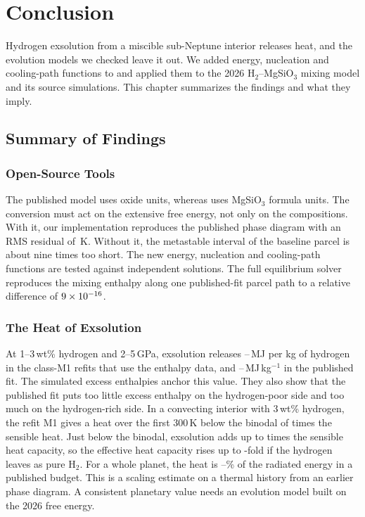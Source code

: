 \chapter{Conclusion}\label{ch:conclusion}

Hydrogen exsolution from a miscible sub-Neptune interior releases heat, and the evolution models
we checked leave it out. We added energy, nucleation and cooling-path functions to \Atm{} and
applied them to the 2026 H$_2$--MgSiO$_3$ mixing model and its source simulations. This chapter
summarizes the findings and what they imply.

\section{Summary of Findings}

\subsection{Open-Source Tools}

The published model uses oxide units, whereas \Atm{} uses MgSiO$_3$ formula units. The
conversion must act on the extensive free energy, not only on the compositions. With it, our
implementation reproduces the published phase diagram with an RMS residual of \digRms{}\,K.
Without it, the metastable interval of the baseline parcel is about nine times too short. The
new energy, nucleation and cooling-path functions are tested against independent solutions. The
full \Atm{} equilibrium solver reproduces the mixing enthalpy along one published-fit parcel path
to a relative difference of $9\times10^{-16}{}$.

\subsection{The Heat of Exsolution}

At 1--3\,wt\% hydrogen and 2--5\,GPa, exsolution releases \hbarMOneLo{}--\hbarMOneHi{}\,MJ per
kg of hydrogen in the class-M1 refits that use the enthalpy data, and
\hbarPubLo{}--\hbarPubHi{}\,MJ\,kg$^{-1}$ in the published fit. The simulated excess enthalpies
anchor this value. They also show that the published fit puts too little excess enthalpy on the
hydrogen-poor side and too much on the hydrogen-rich side. In a convecting interior with
3\,wt\% hydrogen, the refit M1 gives a heat over the first 300\,K below the binodal of
\intRatioThree{} times the sensible heat. Just below the binodal, exsolution adds up to
\intGammaThree{} times the sensible heat capacity, so the effective heat capacity rises up to
\intCeffThree{}-fold if the hydrogen leaves as pure H$_2$. For a whole planet, the heat is
\planetRadiatedLo{}--\planetRadiatedHi{}\% of the radiated energy in a published budget. This is
a scaling estimate on a thermal history from an earlier phase diagram. A consistent
planetary value needs an evolution model built on the 2026 free energy.

